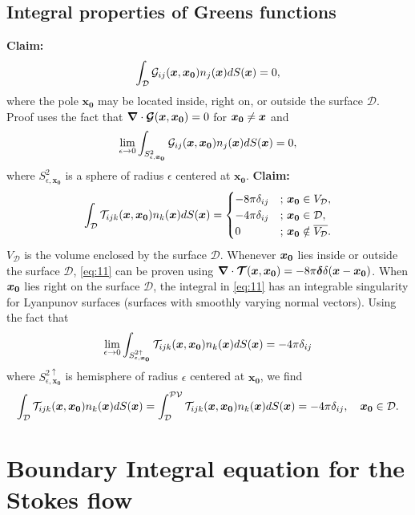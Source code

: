 \documentclass[12pt]{article}
\begin{document}
\subsection{Integral properties of Greens functions}
\textbf{Claim:}	
\begin{equation}
	\label{eq:10}
	\int_{\mathcal{D}} \mathcal{G}_{ij}(\boldsymbol{x},\boldsymbol{x_0}) n_j(\boldsymbol{x}) dS(\boldsymbol{x}) = 0,
\end{equation}
where the pole $\boldsymbol{x_0}$ may be located inside, right on, or outside the surface $\mathcal{D}$.
Proof uses the fact that $\boldsymbol{\nabla} \cdot \boldsymbol{\mathcal{G}}(\boldsymbol{x},\boldsymbol{x_0}) = 0$ for $\boldsymbol{x_0} \neq \boldsymbol{x}$ and $$\lim_{\epsilon \to 0}\int_{S^2_{\epsilon,\boldsymbol{x_0}}} \mathcal{G}_{ij}(\boldsymbol{x},\boldsymbol{x_0}) n_j(\boldsymbol{x}) dS(\boldsymbol{x}) = 0,$$ where $S^2_{\epsilon,\boldsymbol{x_0}}$ is a sphere of radius $\epsilon$ centered at $\boldsymbol{x_0}$. 
\newline
\newline
\textbf{Claim:}	
\begin{equation}
	\label{eq:11}
	\int_{\mathcal{D}} \mathcal{T}_{ijk}(\boldsymbol{x},\boldsymbol{x_0}) n_k(\boldsymbol{x}) dS(\boldsymbol{x}) = \begin{cases}
		-8\pi \delta_{ij} & ;\, \boldsymbol{x_0} \in V_\mathcal{D}, \\
		-4\pi \delta_{ij} & ;\, \boldsymbol{x_0} \in \mathcal{D}, \\
		0 & ;\, \boldsymbol{x_0} \notin \overline{ V_\mathcal{D}}. \\
	\end{cases}
\end{equation}
$V_\mathcal{D}$ is the volume enclosed by the surface $\mathcal{D}$. Whenever $\boldsymbol{x_0}$ lies inside or outside the surface $\mathcal{D}$, \eqref{eq:11} can be proven using $\boldsymbol{\nabla} \cdot \boldsymbol{\mathcal{T}}(\boldsymbol{x},\boldsymbol{x_0}) = -8\pi \boldsymbol{\delta} \delta(\boldsymbol{x} - \boldsymbol{x_0})$.
When $\boldsymbol{x_0}$ lies right on the surface $\mathcal{D}$, the integral in \eqref{eq:11} has an integrable singularity for Lyanpunov surfaces (surfaces with smoothly varying normal vectors). Using the fact that
$$\lim_{\epsilon \to 0}\int_{S^{2\uparrow}_{\epsilon,\boldsymbol{x_0}}} \mathcal{T}_{ijk}(\boldsymbol{x},\boldsymbol{x_0}) n_k(\boldsymbol{x}) dS(\boldsymbol{x}) = -4\pi \delta_{ij}$$ 
where $S^{2\uparrow}_{\epsilon,\boldsymbol{x_0}}$ is hemisphere of radius $\epsilon$ centered at $\boldsymbol{x_0}$, we find 
$$
\int_{\mathcal{D}} \mathcal{T}_{ijk}(\boldsymbol{x},\boldsymbol{x_0}) n_k(\boldsymbol{x}) dS(\boldsymbol{x}) = \int_{\mathcal{D}}^{\mathcal{PV}} \mathcal{T}_{ijk}(\boldsymbol{x},\boldsymbol{x_0}) n_k(\boldsymbol{x}) dS(\boldsymbol{x}) = -4\pi \delta_{ij}, \quad \boldsymbol{x_0} \in \mathcal{D}.
$$


\section{Boundary Integral equation for the Stokes flow}
\end{document}
